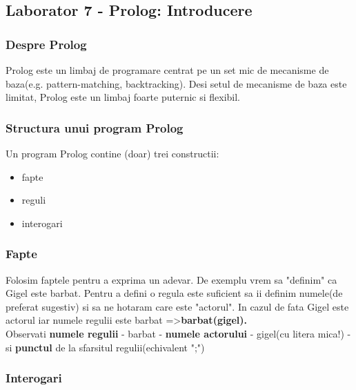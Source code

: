 \subsection*{ Laborator 7 - Prolog: Introducere }
\subsubsection*{ Despre Prolog }

Prolog este un limbaj de programare centrat pe un set mic de mecanisme de baza(e.g. pattern-matching, backtracking). Desi setul de mecanisme de baza este limitat, Prolog este un limbaj foarte puternic si flexibil.

\subsubsection*{ Structura unui program Prolog }

Un program Prolog contine (doar) trei constructii:
 \begin{itemize}
 	\item  fapte
 	\item  reguli
 	\item  interogari
 \end{itemize}

\subsubsection*{ Fapte }

Folosim faptele pentru a exprima un adevar. De exemplu vrem sa "definim" ca Gigel este barbat. Pentru a defini o regula este suficient sa ii definim numele(de preferat sugestiv) si sa ne hotaram care este "actorul".
In cazul de fata Gigel este actorul iar numele regulii este barbat =\textgreater  \textbf{barbat(gigel).}  \\Observati \textbf{numele regulii} - barbat - \textbf{numele actorului} - gigel(cu litera mica!) - si \textbf{punctul} de la sfarsitul regulii(echivalent ";")

\subsubsection*{ Interogari }

